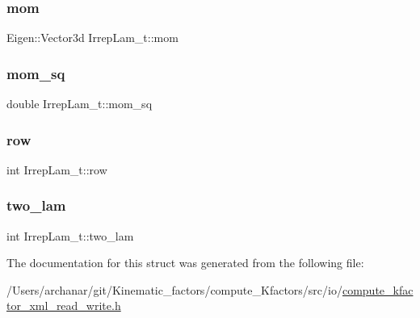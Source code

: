\mbox{\label{structIrrepLam__t_a610bf0af8508ab920d61589c1f748208}} 
\subsubsection{\texorpdfstring{mom}{mom}}
{\footnotesize\ttfamily Eigen\+::\+Vector3d Irrep\+Lam\+\_\+t\+::mom}

\mbox{\label{structIrrepLam__t_aa9a57838bc1de3a127eaaed2643362d1}} 
\subsubsection{\texorpdfstring{mom\_sq}{mom\_sq}}
{\footnotesize\ttfamily double Irrep\+Lam\+\_\+t\+::mom\+\_\+sq}

\mbox{\label{structIrrepLam__t_aafc6b933bfa5353ed9c03779adf76ef3}} 
\subsubsection{\texorpdfstring{row}{row}}
{\footnotesize\ttfamily int Irrep\+Lam\+\_\+t\+::row}

\mbox{\label{structIrrepLam__t_abc021a51cfaa53aaa86e51938fad1189}} 
\subsubsection{\texorpdfstring{two\_lam}{two\_lam}}
{\footnotesize\ttfamily int Irrep\+Lam\+\_\+t\+::two\+\_\+lam}



The documentation for this struct was generated from the following file\+:\begin{DoxyCompactItemize}
\item 
/\+Users/archanar/git/\+Kinematic\+\_\+factors/compute\+\_\+\+Kfactors/src/io/\mbox{\hyperlink{compute__kfactor__xml__read__write_8h}{compute\+\_\+kfactor\+\_\+xml\+\_\+read\+\_\+write.\+h}}\end{DoxyCompactItemize}
